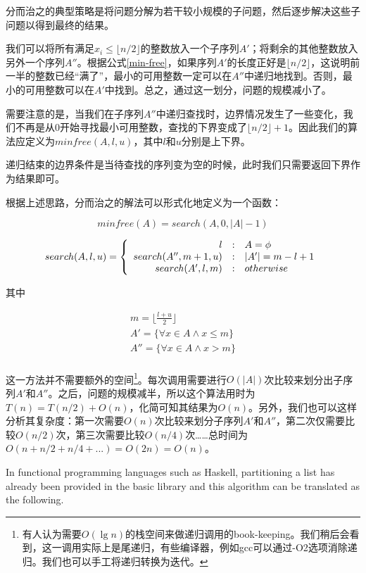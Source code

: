 \documentclass[UTF8]{article}
\begin{document}
分而治之的典型策略是将问题分解为若干较小规模的子问题，然后逐步解决这些子问题以得到最终的结果。

我们可以将所有满足$x_i \leq \lfloor n/2 \rfloor$的整数放入一个子序列$A'$；将剩余的其他整数放入另外一个序列$A''$。根据公式\ref{min-free}，如果序列$A'$的长度正好是$\lfloor n/2 \rfloor$，这说明前一半的整数已经“满了”，最小的可用整数一定可以在$A''$中递归地找到。否则，最小的可用整数可以在$A'$中找到。总之，通过这一划分，问题的规模减小了。

需要注意的是，当我们在子序列$A''$中递归查找时，边界情况发生了一些变化，我们不再是从0开始寻找最小可用整数，查找的下界变成了$\lfloor n/2 \rfloor + 1$。因此我们的算法应定义为$minfree(A, l, u)$，其中$l$和$u$分别是上下界。

递归结束的边界条件是当待查找的序列变为空的时候，此时我们只需要返回下界作为结果即可。

根据上述思路，分而治之的解法可以形式化地定义为一个函数：

\[
minfree(A) = search(A, 0, |A|-1)
\]

\[
search(A, l, u) = \left \{
       \begin{array}
       {r@{\quad:\quad}l}
       l & A = \phi \\
       search(A'', m+1, u) &  |A'| = m - l + 1 \\
       search(A',  l, m) & otherwise
       \end{array}
\right.
\]

其中

\[ \begin{array}{l}
m = \displaystyle \lfloor \frac{l+u}{2} \rfloor \\
A'  = \{ \forall x \in A \wedge x \leq m \} \\
A'' = \{ \forall x \in A \wedge x > m \} \\
\end{array} \]

这一方法并不需要额外的空间\footnote{有人认为需要$O(\lg n)$的栈空间来做递归调用的book-keeping。我们稍后会看到，这一调用实际上是尾递归，有些编译器，例如gcc可以通过-O2选项消除递归。我们也可以手工将递归转换为迭代。}。每次调用需要进行$O(|A|)$次比较来划分出子序列$A'$和$A''$。之后，问题的规模减半，所以这个算法用时为$T(n) = T(n/2) + O(n)$，化简可知其结果为$O(n)$。另外，我们也可以这样分析其复杂度：第一次需要$O(n)$次比较来划分子序列$A'$和$A''$，第二次仅需要比较$O(n/2)$次，第三次需要比较$O(n/4)$次……总时间为$O(n + n/2 + n/4 + ...) = O(2n) = O(n)$。

In functional programming languages such as Haskell,
partitioning a list has already been provided in the basic library
and this algorithm can be translated as the following.
\end{document}
